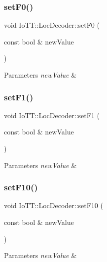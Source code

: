 \subsubsection{\texorpdfstring{set\+F0()}{setF0()}}
{\footnotesize\ttfamily void Io\+T\+T\+::\+Loc\+Decoder\+::set\+F0 (\begin{DoxyParamCaption}\item[{const bool \&}]{new\+Value }\end{DoxyParamCaption})}


\begin{DoxyParams}{Parameters}
{\em new\+Value} & \\
\hline
\end{DoxyParams}
\mbox{\label{classIoTT_1_1LocDecoder_ae1aab97da28929fe5da043eb58295ada}} 
\subsubsection{\texorpdfstring{set\+F1()}{setF1()}}
{\footnotesize\ttfamily void Io\+T\+T\+::\+Loc\+Decoder\+::set\+F1 (\begin{DoxyParamCaption}\item[{const bool \&}]{new\+Value }\end{DoxyParamCaption})}


\begin{DoxyParams}{Parameters}
{\em new\+Value} & \\
\hline
\end{DoxyParams}
\mbox{\label{classIoTT_1_1LocDecoder_a35283471e9b8cc893d04bdf71487ce0b}} 
\subsubsection{\texorpdfstring{set\+F10()}{setF10()}}
{\footnotesize\ttfamily void Io\+T\+T\+::\+Loc\+Decoder\+::set\+F10 (\begin{DoxyParamCaption}\item[{const bool \&}]{new\+Value }\end{DoxyParamCaption})}


\begin{DoxyParams}{Parameters}
{\em new\+Value} & \\
\hline
\end{DoxyParams}
\mbox{\label{classIoTT_1_1LocDecoder_ac81445f413f23a6e13ecbdf3a1910686}} 
